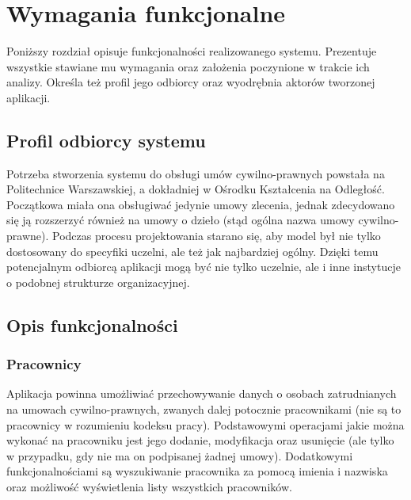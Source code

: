 \chapter{Wymagania funkcjonalne}
\label{chap3}
Poniższy rozdział opisuje funkcjonalności realizowanego systemu. Prezentuje wszystkie stawiane mu wymagania oraz założenia poczynione w trakcie ich analizy. Określa też profil jego odbiorcy oraz wyodrębnia aktorów tworzonej aplikacji.


\section[Profil odbiorcy systemu][Profil odbiorcy systemu]{Profil odbiorcy systemu}
Potrzeba stworzenia systemu do obsługi umów cywilno-prawnych powstała na Politechnice Warszawskiej, a dokładniej w Ośrodku Kształcenia na Odległość. Początkowa miała ona obsługiwać jedynie umowy zlecenia, jednak zdecydowano się ją rozszerzyć również na umowy o dzieło (stąd ogólna nazwa umowy cywilno-prawne). Podczas procesu projektowania starano się, aby model był nie tylko dostosowany do specyfiki uczelni, ale też jak najbardziej ogólny. Dzięki temu potencjalnym odbiorcą aplikacji mogą być nie tylko uczelnie, ale i inne instytucje o podobnej strukturze organizacyjnej.

\section[Opis funkcjonalności][Opis funkcjonalności]{Opis funkcjonalności}

\subsection[Pracownicy][Pracownicy]{Pracownicy}
\label{pracownicy}
Aplikacja powinna umożliwiać przechowywanie danych o osobach zatrudnianych na umowach cywilno-prawnych, zwanych dalej potocznie pracownikami (nie są to pracownicy w rozumieniu kodeksu pracy). Podstawowymi operacjami jakie można wykonać na pracowniku jest jego dodanie, modyfikacja oraz usunięcie (ale tylko w przypadku, gdy nie ma on podpisanej żadnej umowy). Dodatkowymi funkcjonalnościami są wyszukiwanie pracownika za pomocą imienia i nazwiska oraz możliwość wyświetlenia listy wszystkich pracowników.

